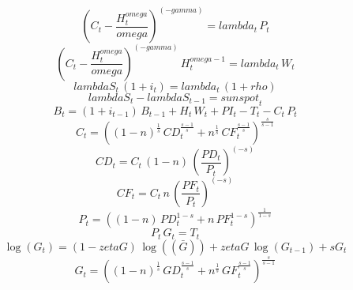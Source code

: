 \begin{dmath}
\left({C}_{t}-\frac{{H}_{t}^{{omega}}}{{omega}}\right)^{\left(-{gamma}\right)}={lambda}_{t}\, {P}_{t}
\end{dmath}
\begin{dmath}
\left({C}_{t}-\frac{{H}_{t}^{{omega}}}{{omega}}\right)^{\left(-{gamma}\right)}\, {H}_{t}^{{omega}-1}={lambda}_{t}\, {W}_{t}
\end{dmath}
\begin{dmath}
{lambdaS}_{t}\, \left(1+{i}_{t}\right)={lambda}_{t}\, \left(1+{rho}\right)
\end{dmath}
\begin{dmath}
{lambdaS}_{t}-{lambdaS}_{t-1}={sunspot}_{t}
\end{dmath}
\begin{dmath}
{B}_{t}=\left(1+{i}_{t-1}\right)\, {B}_{t-1}+{H}_{t}\, {W}_{t}+{PI}_{t}-{T}_{t}-{C}_{t}\, {P}_{t}
\end{dmath}
\begin{dmath}
{C}_{t}=\left(\left(1-{n}\right)^{\frac{1}{{s}}}\, {CD}_{t}^{\frac{{s}-1}{{s}}}+{n}^{\frac{1}{{s}}}\, {CF}_{t}^{\frac{{s}-1}{{s}}}\right)^{\frac{{s}}{{s}-1}}
\end{dmath}
\begin{dmath}
{CD}_{t}={C}_{t}\, \left(1-{n}\right)\, \left(\frac{{PD}_{t}}{{P}_{t}}\right)^{\left(-{s}\right)}
\end{dmath}
\begin{dmath}
{CF}_{t}={C}_{t}\, {n}\, \left(\frac{{PF}_{t}}{{P}_{t}}\right)^{\left(-{s}\right)}
\end{dmath}
\begin{dmath}
{P}_{t}=\left(\left(1-{n}\right)\, {PD}_{t}^{1-{s}}+{n}\, {PF}_{t}^{1-{s}}\right)^{\frac{1}{1-{s}}}
\end{dmath}
\begin{dmath}
{P}_{t}\, {G}_{t}={T}_{t}
\end{dmath}
\begin{dmath}
\log\left({G}_{t}\right)=\left(1-{zetaG}\right)\, \log\left((\bar{G})\right)+{zetaG}\, \log\left({G}_{t-1}\right)+{sG}_{t}
\end{dmath}
\begin{dmath}
{G}_{t}=\left(\left(1-{n}\right)^{\frac{1}{{s}}}\, {GD}_{t}^{\frac{{s}-1}{{s}}}+{n}^{\frac{1}{{s}}}\, {GF}_{t}^{\frac{{s}-1}{{s}}}\right)^{\frac{{s}}{{s}-1}}
\end{dmath}
